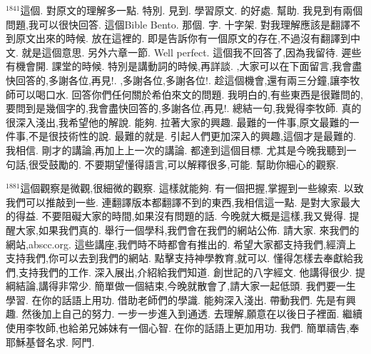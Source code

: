 \documentclass{book}
\begin{document}
$^{1841}$這個.
對原文的理解多一點.
特別.
見到.
學習原文.
的好處.
幫助.
我見到有兩個問題,我可以很快回答.
這個Bible Bento.
那個.
字.
十字架.
對我理解應該是翻譯不到原文出來的時候.
放在這裡的.
即是告訴你有一個原文的存在,不過沒有翻譯到中文.
就是這個意思.
另外六章一節.
Well perfect.
這個我不回答了,因為我留待.
遲些有機會開.
課堂的時候.
特別是講動詞的時候,再詳談.
,大家可以在下面留言,我會盡快回答的,多謝各位,再見!.
,多謝各位,多謝各位!.
趁這個機會,還有兩三分鐘,讓李牧師可以喝口水.
回答你們任何關於希伯來文的問題.
我明白的,有些東西是很難問的,要問到是幾個字的,我會盡快回答的,多謝各位,再見!.
總結一句,我覺得李牧師.
真的很深入淺出,我希望他的解說.
能夠.
拉著大家的興趣.
最難的一件事,原文最難的一件事,不是很技術性的說.
最難的就是.
引起人們更加深入的興趣,這個才是最難的.
我相信.
剛才的講論,再加上上一次的講論.
都達到這個目標.
尤其是今晚我聽到一句話,很受鼓勵的.
不要期望懂得語言,可以解釋很多,可能.
幫助你細心的觀察.

$^{1881}$這個觀察是微觀,很細微的觀察.
這樣就能夠.
有一個把握,掌握到一些線索.
以致我們可以推敲到一些.
連翻譯版本都翻譯不到的東西,我相信這一點.
是對大家最大的得益.
不要阻礙大家的時間,如果沒有問題的話.
今晚就大概是這樣,我又覺得.
提醒大家,如果我們真的.
舉行一個學科,我們會在我們的網站公佈.
請大家.
來我們的網站,abscc.org.
這些講座,我們時不時都會有推出的.
希望大家都支持我們,經濟上支持我們,你可以去到我們的網站.
點擊支持神學教育,就可以.
懂得怎樣去奉獻給我們,支持我們的工作.
深入展出,介紹給我們知道.
創世記的八字經文.
他講得很少.
提綱結論,講得非常少.
簡單做一個結束,今晚就散會了,請大家一起低頭.
我們要一生學習.
在你的話語上用功.
借助老師們的學識.
能夠深入淺出.
帶動我們.
先是有興趣.
然後加上自己的努力.
一步一步進入到通透.
去理解,願意在以後日子裡面.
繼續使用李牧師,也給弟兄姊妹有一個心智.
在你的話語上更加用功.
我們.
簡單禱告,奉耶穌基督名求.
阿門.
\newpage
\end{document}

